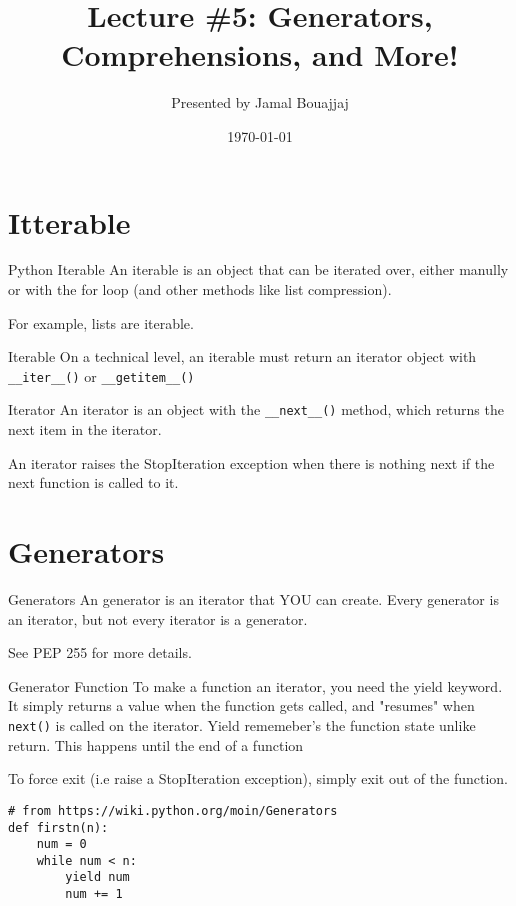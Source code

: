 \documentclass[10pt]{beamer}
\title{Lecture \#5: Generators, Comprehensions, and More!}
\date{\today}
\author{Presented by Jamal Bouajjaj}
\institute{For University of New Haven's Fall 2023 CSCIxx51 Course}
\begin{document}
\maketitle

\section{Itterable}

\begin{frame}{Python Iterable}
  An iterable is an object that can be iterated over, either manully or with the for loop (and other methods like list compression).

  For example, lists are iterable.
\end{frame}

\begin{frame}[containsverbatim]{Iterable}
  On a technical level, an iterable must return an iterator object with \texttt{__iter__()} or \texttt{__getitem__()}
\end{frame}

\begin{frame}[containsverbatim]{Iterator}
  An iterator is an object with the \texttt{__next__()} method, which returns the next item in the iterator.

  An iterator raises the StopIteration exception when there is nothing next if the next function is called to it.
\end{frame}

\section{Generators}

\begin{frame}{Generators}
  An generator is an iterator that YOU can create. Every generator is an iterator, but not every iterator is a generator.

  See PEP 255 for more details.
\end{frame}

\begin{frame}[containsverbatim]{Generator Function}
  To make a function an iterator, you need the yield keyword. It simply returns a value when the function gets called, and "resumes" when \texttt{next()} is called on the iterator. Yield rememeber's the function state unlike return. This happens until the end of a function

  To force exit (i.e raise a StopIteration exception), simply exit out of the function.
  \begin{verbatim}
# from https://wiki.python.org/moin/Generators
def firstn(n):
    num = 0
    while num < n:
        yield num
        num += 1
  \end{verbatim}
\end{frame}
\end{document}
